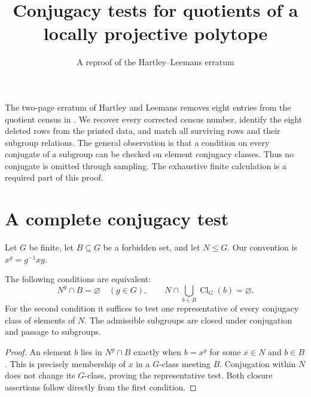 \documentclass[11pt,a4paper]{article}
\title{Conjugacy tests for quotients of a locally projective polytope}
\author{A reproof of the Hartley--Leemans erratum}\date{}
\newcommand{\Cl}{\operatorname{Cl}}\newcommand{\Aut}{\operatorname{Aut}}\newcommand{\Cen}{\operatorname{C}}
\begin{document}
\maketitle
The two-page erratum of Hartley and Leemans \cite{erratum} removes eight entries from the quotient census in \cite{original}. We recover every corrected census number, identify the eight deleted rows from the printed data, and match all surviving rows and their subgroup relations. The general observation is that a condition on every conjugate of a subgroup can be checked on element conjugacy classes. Thus no conjugate is omitted through sampling. The exhaustive finite calculation is a required part of this proof.

\section{A complete conjugacy test}
Let $G$ be finite, let $B\subseteq G$ be a forbidden set, and let $N\leq G$. Our convention is $x^g=g^{-1}xg$.
\begin{lemma}\label{avoid}
The following conditions are equivalent:
\[
 N^g\cap B=\varnothing\quad(g\in G),\qquad
 N\cap\bigcup_{b\in B}\Cl_G(b)=\varnothing.
\]
For the second condition it suffices to test one representative of every conjugacy class of elements of $N$. The admissible subgroups are closed under conjugation and passage to subgroups.
\end{lemma}
\begin{proof}
An element $b$ lies in $N^g\cap B$ exactly when $b=x^g$ for some $x\in N$ and $b\in B$. This is precisely membership of $x$ in a $G$-class meeting $B$. Conjugation within $N$ does not change its $G$-class, proving the representative test. Both closure assertions follow directly from the first condition.
\end{proof}
\end{document}
